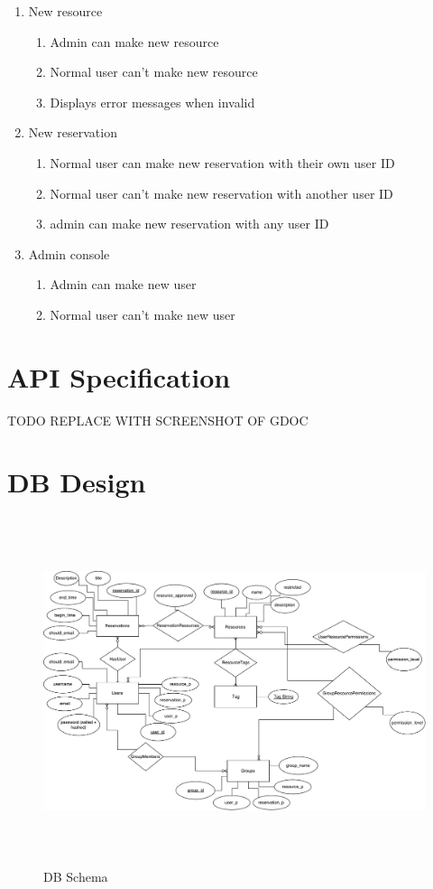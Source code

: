 \documentclass[12pt]{article}
\begin{document}
\begin{enumerate}
\begin{enumerate}
        \item Admin user can edit/delete anything
        \item Deleting a resource with a future reservation shows a warning
    \end{enumerate}
    \item New resource
    \begin{enumerate}
        \item Admin can make new resource
        \item Normal user can't make new resource
        \item Displays error messages when invalid
    \end{enumerate}
    \item New reservation
    \begin{enumerate}
        \item Normal user can make new reservation with their own user ID
        \item Normal user can't make new reservation with another user ID
        \item admin can make new reservation with any user ID
    \end{enumerate}
    \item Admin console
    \begin{enumerate}
        \item Admin can make new user
        \item Normal user can't make new user
    \end{enumerate}
\end{enumerate}

\clearpage
\section{API Specification}
\label{appendix:apispec}
{\huge TODO REPLACE WITH SCREENSHOT OF GDOC}

\clearpage
\section{DB Design}
\label{appendix:DBDesign}
\begin{figure}[h]
\begin{center}
\includegraphics[height=4in]{Evolution3DB.pdf}
\end{center}
\caption{DB Schema}
\end{figure}
\end{document}

